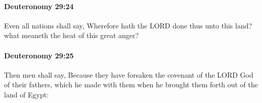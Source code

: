 		\paragraph{Deuteronomy 29:24} %
			\label{DEUTERONOMY-29-24}

			Even all nations shall say, Wherefore hath the LORD done thus unto this land? what meaneth the heat of this great anger?


		\paragraph{Deuteronomy 29:25} %
			\label{DEUTERONOMY-29-25}

			Then men shall say, Because they have forsaken the covenant of the LORD God of their fathers, which he made with them when he brought them forth out of the land of Egypt:


